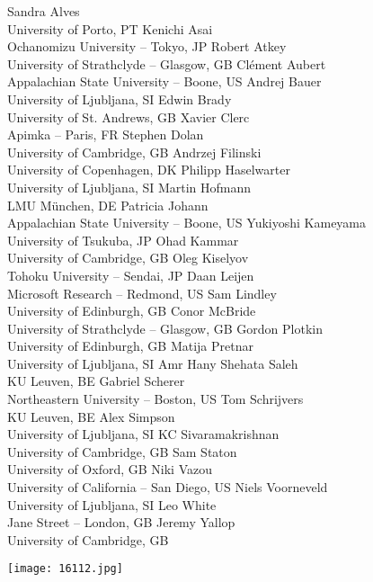 \documentclass[a4paper,UKenglish]{dagrep}
\begin{document}
\begin{participants}
  \participant Sandra Alves\\ University of Porto, PT
  \participant Kenichi Asai\\ Ochanomizu University -- Tokyo, JP
  \participant Robert Atkey\\ University of Strathclyde -- Glasgow, GB
  \participant Clément Aubert\\ Appalachian State University -- Boone, US
  \participant Andrej Bauer\\ University of Ljubljana, SI
  \participant Edwin Brady\\ University of St. Andrews, GB
  \participant Xavier Clerc\\ Apimka -- Paris, FR
  \participant Stephen Dolan\\ University of Cambridge, GB
  \participant Andrzej Filinski\\ University of Copenhagen, DK
  \participant Philipp Haselwarter\\ University of Ljubljana, SI
  \participant Martin Hofmann\\ LMU München, DE
  \participant Patricia Johann\\ Appalachian State University -- Boone, US
  \participant Yukiyoshi Kameyama\\ University of Tsukuba, JP
  \participant Ohad Kammar\\ University of Cambridge, GB
  \participant Oleg Kiselyov\\ Tohoku University -- Sendai, JP
  \participant Daan Leijen\\ Microsoft Research -- Redmond, US
  \participant Sam Lindley\\ University of Edinburgh, GB
  \participant Conor McBride\\ University of Strathclyde -- Glasgow, GB
  \participant Gordon Plotkin\\ University of Edinburgh, GB
  \participant Matija Pretnar\\ University of Ljubljana, SI
  \participant Amr Hany Shehata Saleh\\ KU Leuven, BE
  \participant Gabriel Scherer\\ Northeastern University -- Boston, US
  \participant Tom Schrijvers\\ KU Leuven, BE
  \participant Alex Simpson\\ University of Ljubljana, SI
  \participant KC Sivaramakrishnan\\ University of Cambridge, GB
  \participant Sam Staton\\ University of Oxford, GB
  \participant Niki Vazou\\ University of California -- San Diego, US
  \participant Niels Voorneveld\\ University of Ljubljana, SI
  \participant Leo White\\ Jane Street -- London, GB
  \participant Jeremy Yallop\\ University of Cambridge, GB
\end{participants}

\vfill

\begin{center}
\texttt{[image: 16112.jpg]}
\end{center}

\vfill
\end{document}
